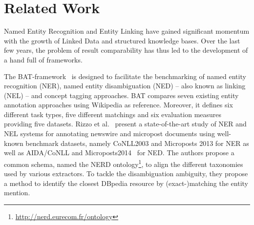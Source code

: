 \section{Related Work}
Named Entity Recognition and Entity Linking have gained significant momentum with the growth of Linked Data and structured knowledge bases. Over the last few years, the problem of result comparability has thus led to the development of a hand full of frameworks.

The BAT-framework~\cite{cornolti} is designed to facilitate the benchmarking of named entity recognition (NER), named entity disambiguation (NED) -- also known as linking (NEL) -- and concept tagging approaches.
BAT compares seven existing entity annotation approaches using Wikipedia as reference.
Moreover, it defines six different task types, five different matchings and six evaluation measures providing five datasets.
Rizzo et al.~\cite{rizzo2014}  present a state-of-the-art study of NER and NEL systems for annotating newswire and micropost documents using well-known benchmark datasets, namely CoNLL2003 and Microposts 2013 for NER as well as AIDA/CoNLL and Microposts2014~\cite{Cano2014} for NED. 
The authors propose a common schema, named the NERD ontology\footnote{\url{http://nerd.eurecom.fr/ontology}}, to align the different taxonomies used by various extractors. To tackle the disambiguation ambiguity, they propose a method to identify the closest DBpedia resource by (exact-)matching the entity mention.

